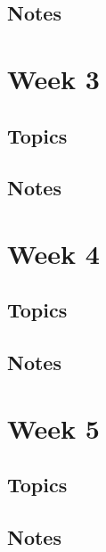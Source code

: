 \documentclass[12pt]{article}
\begin{document}
\subsection{Notes}



\section{Week 3}

\subsection{Topics}

\subsection{Notes}





\section{Week 4}

\subsection{Topics}

\subsection{Notes}





\enlargethispage{200pt}
\section{Week 5}

\subsection{Topics}

\subsection{Notes}
\end{document}
